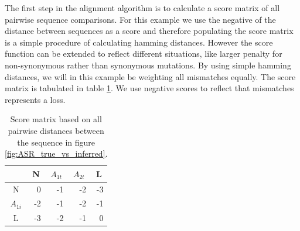 The first step in the alignment algorithm is to calculate a score matrix of all pairwise sequence comparisons.
For this example we use the negative of the distance between sequences as a score and therefore populating the score matrix is a simple procedure of calculating hamming distances.
However the score function can be extended to reflect different situations, like larger penalty for non-synonymous rather than synonymous mutations.
By using simple hamming distances, we will in this example be weighting all mismatches equally.
The score matrix is tabulated in table \ref{distance_matrix}.
We use negative scores to reflect that mismatches represents a loss.

\begin{table}[ht!]
\centering
\begin{tabular}{c|r|r|r|r}
\rowcolor[HTML]{EFEFEF}
                                 & \multicolumn{1}{c|}{\cellcolor[HTML]{EFEFEF}N} & \multicolumn{1}{c|}{\cellcolor[HTML]{EFEFEF}$A_{1t}$} & \multicolumn{1}{c|}{\cellcolor[HTML]{EFEFEF}$A_{2t}$} & \multicolumn{1}{c}{\cellcolor[HTML]{EFEFEF}L} \\ \hline
\cellcolor[HTML]{EFEFEF}N        & 0                                              & -1                                                    & -2                                                    & \multicolumn{1}{r|}{-3}                       \\ \hline
\cellcolor[HTML]{EFEFEF}$A_{1i}$ & -2                                             & -1                                                     & -2                                                    & \multicolumn{1}{r|}{-1}                       \\ \hline
\cellcolor[HTML]{EFEFEF}L        & -3                                             & -2                                                    & -1                                                    & \multicolumn{1}{r|}{0}                        \\ \hline
\end{tabular}
    \caption{
         \label{distance_matrix}
             Score matrix based on all pairwise distances between the sequence in figure \ref{fig:ASR_true_vs_inferred}.
             }
\end{table}

